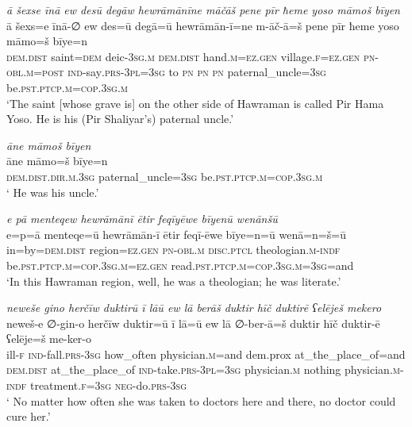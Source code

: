 \ea \label{ZP.6}
\textit{ā šexse īnā ew desū degāw hewrāmānīne māčāš pene pīr ħeme yoso māmoš bīyen} \\ 
\gll ā šexs=e īnā-∅ ew des=ū degā=ū hewrāmān-ī=ne m-āč-ā=š pene pīr ħeme yoso māmo=š bīye=n \\ 
 \textsc{dem.dist} saint\textsc{=dem} deic\textsc{-3sg}\textsc{.m} \textsc{dem.dist} hand\textsc{.m}\textsc{\textsc{=ez.gen}} village\textsc{.f}\textsc{\textsc{=ez.gen}} \textsc{pn}\textsc{-obl}\textsc{.m}\textsc{=\textsc{post}} \textsc{ind-}say\textsc{.prs}\textsc{-3pl}\textsc{=3sg} to \textsc{pn} \textsc{pn} \textsc{pn} paternal\_uncle\textsc{=3sg} be\textsc{.pst}\textsc{.ptcp}\textsc{.m}\textsc{=cop}\textsc{.3sg}\textsc{.m} \\ 
\glt `The saint [whose grave is] on the other side of Hawraman is called Pir Hama Yoso. He is his (Pir Shaliyar’s) paternal uncle.'
\z 
 
\ea \label{ZP.7}
\textit{āne māmoš bīyen} \\ 
\gll āne māmo=š bīye=n \\ 
 \textsc{dem.dist}\textsc{.dir}\textsc{.m}\textsc{.3sg} paternal\_uncle\textsc{=3sg} be\textsc{.pst}\textsc{.ptcp}\textsc{.m}\textsc{=cop}\textsc{.3sg}\textsc{.m} \\ 
\glt ` He was his uncle.'
\z 
 
\ea \label{ZP.23}
\textit{e pā menteqew hewrāmānī ētir feqīyēwe bīyenū wenānšū} \\ 
\gll e=p=ā menteqe=ū hewrāmān-ī ētir feqī-ēwe bīye=n=ū wenā=n=š=ū \\ 
 in=by=\textsc{dem.dist} region\textsc{\textsc{=ez.gen}} \textsc{pn}\textsc{-obl}\textsc{.m} \textsc{disc.ptcl} theologian\textsc{.m}\textsc{-indf} be\textsc{.pst}\textsc{.ptcp}\textsc{.m}\textsc{=cop}\textsc{.3sg}\textsc{.m}\textsc{\textsc{=ez.gen}} read\textsc{.pst}\textsc{.ptcp}\textsc{.m}\textsc{=cop}\textsc{.3sg}\textsc{.m}\textsc{=3sg}=and \\ 
\glt `In this Hawraman region, well, he was a theologian; he was literate.'
\z 
 
\ea \label{ZP.26}
\textit{neweše gino herčīw duktirū ī lāū ew lā berāš duktir hīč duktirē ʕelēješ mekero} \\ 
\gll neweš-e ∅-gin-o herčīw duktir=ū ī lā=ū ew lā ∅-ber-ā=š duktir hīč duktir-ē ʕelēje=š me-ker-o \\ 
 ill\textsc{-f} \textsc{ind-}fall\textsc{.prs}\textsc{-3sg} how\_often physician\textsc{.m}=and dem.prox at\_the\_place\_of=and \textsc{dem.dist} at\_the\_place\_of \textsc{ind-}take\textsc{.prs}\textsc{-3pl}\textsc{=3sg} physician\textsc{.m} nothing physician\textsc{.m}\textsc{-indf} treatment\textsc{.f}\textsc{=3sg} \textsc{neg-}do\textsc{.prs}\textsc{-3sg} \\ 
\glt ` No matter how often she was taken to doctors here and there, no doctor could cure her.'
\z 
 
